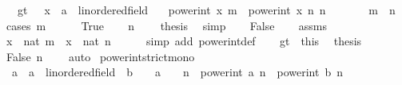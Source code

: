 \begin{isabellebody}
\ \ \ gt{}{\isacharcolon}{\kern0pt}\ {\isachardoublequoteopen}{}\ {\isacharless}{\kern0pt}\ {\isacharparenleft}{\kern0pt}x\ {\isacharcolon}{\kern0pt}{\isacharcolon}{\kern0pt}\ {\isacharprime}{\kern0pt}a\ {\isacharcolon}{\kern0pt}{\isacharcolon}{\kern0pt}\ linordered{\isacharunderscore}{\kern0pt}field{\isacharparenright}{\kern0pt}{\isachardoublequoteclose}\isanewline
\ \ \ {\isachardoublequoteopen}power{\isacharunderscore}{\kern0pt}int\ x\ m\ {\isacharless}{\kern0pt}\ power{\isacharunderscore}{\kern0pt}int\ x\ n{\isachardoublequoteclose}\ {\isachardoublequoteopen}n\ {\isasymge}\ {}{\isachardoublequoteclose}\isanewline
\ \ \ \ \ {\isachardoublequoteopen}m\ {\isacharless}{\kern0pt}\ n{\isachardoublequoteclose}\isanewline
%
\isadelimproof
%
\endisadelimproof
%
\isatagproof
{}\isamarkupfalse%
\ {\isacharparenleft}{\kern0pt}cases\ {\isachardoublequoteopen}m\ {\isacharless}{\kern0pt}\ {}{\isachardoublequoteclose}{\isacharparenright}{\kern0pt}\isanewline
\ \ \isamarkupfalse%
\ True\isanewline
\ \ \isamarkupfalse%
\ {\isacartoucheopen}n\ {\isasymge}\ {}{\isacartoucheclose}\ \isamarkupfalse%
\ {\isacharquery}{\kern0pt}thesis\ \isamarkupfalse%
\ simp\isanewline
{}\isamarkupfalse%
\isanewline
\ \ \isamarkupfalse%
\ False\isanewline
\ \ \isamarkupfalse%
\ assms\ \isamarkupfalse%
\ {\isachardoublequoteopen}x\ {\isacharcircum}{\kern0pt}\ nat\ m\ {\isacharless}{\kern0pt}\ x\ {\isacharcircum}{\kern0pt}\ nat\ n{\isachardoublequoteclose}\isanewline
\ \ \ \ \isamarkupfalse%
\ {\isacharparenleft}{\kern0pt}simp\ add{\isacharcolon}{\kern0pt}\ power{\isacharunderscore}{\kern0pt}int{\isacharunderscore}{\kern0pt}def{\isacharparenright}{\kern0pt}\isanewline
\ \ \isamarkupfalse%
\ gt{}\ \ this\ \isamarkupfalse%
\ {\isacharquery}{\kern0pt}thesis\isanewline
\ \ \ \ \isamarkupfalse%
\ False\ {\isacartoucheopen}n\ {\isasymge}\ {}{\isacartoucheclose}\ \isamarkupfalse%
\ auto\isanewline
{}\isamarkupfalse%
%
\endisatagproof
{\isafoldproof}%
%
\isadelimproof
\isanewline
%
\endisadelimproof
\isanewline
{}\isamarkupfalse%
\ power{\isacharunderscore}{\kern0pt}int{\isacharunderscore}{\kern0pt}strict{\isacharunderscore}{\kern0pt}mono{\isacharcolon}{\kern0pt}\isanewline
\ \ {\isachardoublequoteopen}{\isacharparenleft}{\kern0pt}a\ {\isacharcolon}{\kern0pt}{\isacharcolon}{\kern0pt}\ {\isacharprime}{\kern0pt}a\ {\isacharcolon}{\kern0pt}{\isacharcolon}{\kern0pt}\ linordered{\isacharunderscore}{\kern0pt}field{\isacharparenright}{\kern0pt}\ {\isacharless}{\kern0pt}\ b\ {\isasymLongrightarrow}\ {}\ {\isasymle}\ a\ {\isasymLongrightarrow}\ {}\ {\isacharless}{\kern0pt}\ n\ {\isasymLongrightarrow}\ power{\isacharunderscore}{\kern0pt}int\ a\ n\ {\isacharless}{\kern0pt}\ power{\isacharunderscore}{\kern0pt}int\ b\ n{\isachardoublequoteclose}\isanewline

\end{isabellebody}
